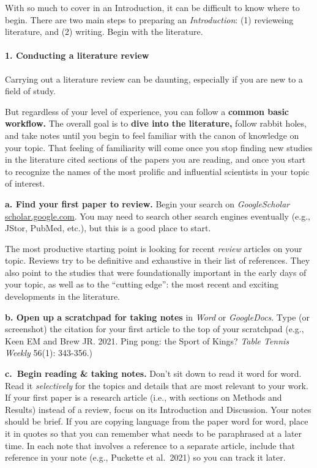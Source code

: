 \documentclass[
]{book}
\begin{document}
With so much to cover in an Introduction, it can be difficult to know where to begin. There are two main steps to preparing an \emph{Introduction}: (1) revieweing literature, and (2) writing. Begin with the literature.

\hypertarget{conducting-a-literature-review}{%
\paragraph*{1. Conducting a literature review}\label{conducting-a-literature-review}}

Carrying out a literature review can be daunting, especially if you are new to a field of study.

But regardless of your level of experience, you can follow a \textbf{common basic workflow.} The overall goal is to \textbf{dive into the literature,} follow rabbit holes, and take notes until you begin to feel familiar with the canon of knowledge on your topic. That feeling of familiarity will come once you stop finding new studies in the literature cited sections of the papers you are reading, and once you start to recognize the names of the most prolific and influential scientists in your topic of interest.

\textbf{a. Find your first paper to review.} Begin your search on \emph{GoogleScholar} \url{scholar.google.com}. You may need to search other search engines eventually (e.g., JStor, PubMed, etc.), but this is a good place to start.

The most productive starting point is looking for recent \emph{review} articles on your topic. Reviews try to be definitive and exhaustive in their list of references. They also point to the studies that were foundationally important in the early days of your topic, as well as to the ``cutting edge'': the most recent and exciting developments in the literature.

\textbf{b. Open up a scratchpad for taking notes} in \emph{Word} or \emph{GoogleDocs}. Type (or screenshot) the citation for your first article to the top of your scratchpad (e.g., Keen EM and Brew JR. 2021. Ping pong: the Sport of Kings? \emph{Table Tennis Weekly} 56(1): 343-356.)

\textbf{c.~Begin reading \& taking notes.} Don't sit down to read it word for word. Read it \emph{selectively} for the topics and details that are most relevant to your work. If your first paper is a research article (i.e., with sections on Methods and Results) instead of a review, focus on its Introduction and Discussion. Your notes should be brief. If you are copying language from the paper word for word, place it in quotes so that you can remember what needs to be paraphrased at a later time. In each note that involves a reference to a separate article, include that reference in your note (e.g.,
Puckette et al.~2021) so you can track it later.
\end{document}
